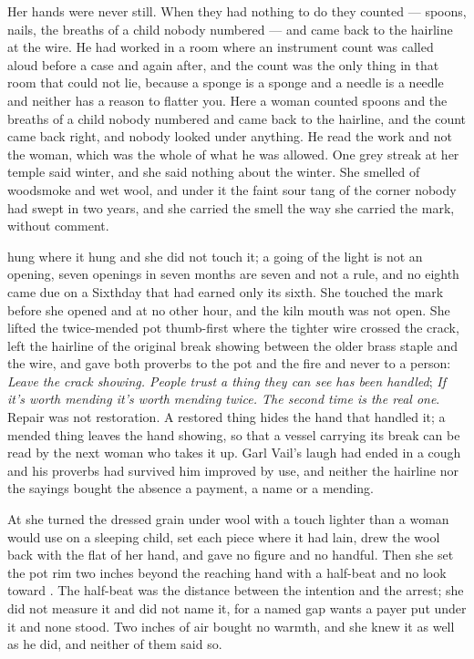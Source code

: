 Her hands were never still. When they had nothing to do they counted --- spoons, nails, the breaths of a child nobody numbered --- and came back to the hairline at the wire. He had worked in a room where an instrument count was called aloud before a case and again after, and the count was the only thing in that room that could not lie, because a sponge is a sponge and a needle is a needle and neither has a reason to flatter you. Here a woman counted spoons and the breaths of a child nobody numbered and came back to the hairline, and the count came back right, and nobody looked under anything. He read the work and not the woman, which was the whole of what he was allowed. One grey streak at her temple said winter, and she said nothing about the winter. She smelled of woodsmoke and wet wool, and under it the faint sour tang of the corner nobody had swept in two years, and she carried the smell the way she carried the mark, without comment.

 hung where it hung and she did not touch it; a going of the light is not an opening, seven openings in seven months are seven and not a rule, and no eighth came due on a Sixthday that had earned only its sixth. She touched the mark before she opened  and at no other hour, and the kiln mouth was not open. She lifted the twice-mended pot thumb-first where the tighter wire crossed the crack, left the hairline of the original break showing between the older brass staple and the wire, and gave both proverbs to the pot and the fire and never to a person: \emph{Leave the crack showing. People trust a thing they can see has been handled}; \emph{If it's worth mending it's worth mending twice. The second time is the real one}. Repair was not restoration. A restored thing hides the hand that handled it; a mended thing leaves the hand showing, so that a vessel carrying its break can be read by the next woman who takes it up. Garl Vail's laugh had ended in a cough and his proverbs had survived him improved by use, and neither the hairline nor the sayings bought the absence a payment, a name or a mending.

At  she turned the dressed grain under wool with a touch lighter than a woman would use on a sleeping child, set each piece where it had lain, drew the wool back with the flat of her hand, and gave no figure and no handful. Then she set the pot rim two inches beyond the reaching hand with a half-beat and no look toward . The half-beat was the distance between the intention and the arrest; she did not measure it and did not name it, for a named gap wants a payer put under it and none stood. Two inches of air bought no warmth, and she knew it as well as he did, and neither of them said so.

